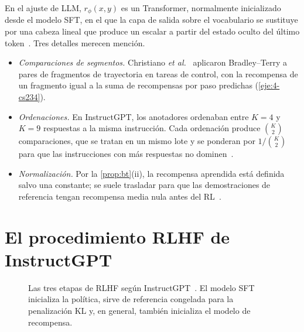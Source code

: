 En el ajuste de LLM, $r_\phi(x,y)$ es un Transformer, normalmente inicializado desde el modelo SFT, en el que la capa de salida sobre el vocabulario se sustituye por una cabeza lineal que produce un escalar a partir del estado oculto del último token~\cite{stiennon,instructgpt}. Tres detalles merecen mención.
\begin{itemize}[leftmargin=1.4em,label=\textendash]
  \item \emph{Comparaciones de segmentos.} Christiano \emph{et al.}~\cite{christiano} aplicaron Bradley--Terry a pares de fragmentos de trayectoria en tareas de control, con la recompensa de un fragmento igual a la suma de recompensas por paso predichas (\cref{eje:4-cs234}).
  \item \emph{Ordenaciones.} En InstructGPT, los anotadores ordenaban entre $K=4$ y $K=9$ respuestas a la misma instrucción. Cada ordenación produce $\binom{K}{2}$ comparaciones, que se tratan en un mismo lote y se ponderan por $1/\binom{K}{2}$ para que las instrucciones con más respuestas no dominen~\cite[§3.5]{instructgpt}.
  \item \emph{Normalización.} Por la \cref{prop:bt}(ii), la recompensa aprendida está definida salvo una constante; se suele trasladar para que las demostraciones de referencia tengan recompensa media nula antes del RL~\cite{stiennon,instructgpt}.
\end{itemize}

\section{El procedimiento RLHF de InstructGPT}

\begin{figure}[h]
\centering
{}
\caption{Las tres etapas de RLHF según InstructGPT~\cite{instructgpt}. El modelo SFT inicializa la política, sirve de referencia congelada para la penalización KL y, en general, también inicializa el modelo de recompensa.}
\label{fig:rlhf}
\end{figure}

